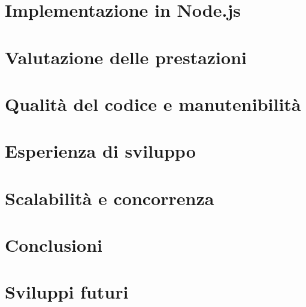\newpage
\section{Implementazione in Node.js}

\section{Valutazione delle prestazioni}
\section{Qualità del codice e manutenibilità}
\section{Esperienza di sviluppo}
\section{Scalabilità e concorrenza}
\section{Conclusioni}
\section{Sviluppi futuri}



\begin{lstlisting}[language=rust, showstringspaces=false]
\end{lstlisting}